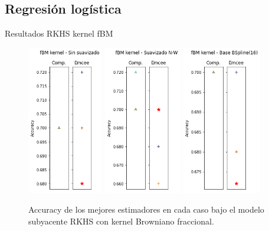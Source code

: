 \documentclass[10pt, professionalfonts]{beamer}
\begin{document}
\subsection{Regresión logística}

\begin{frame}{Resultados RKHS kernel fBM}
  \begin{figure}
    \includegraphics[width=0.295\textwidth]{img/results-new/clf_rkhs_fbm_none}\hfill
    \includegraphics[width=0.3\textwidth]{img/results-new/clf_rkhs_fbm_nw}\hfill
    \includegraphics[width=0.31\textwidth]{img/results-new/clf_rkhs_fbm_basis}
    \caption{Accuracy de los mejores estimadores en cada caso bajo el modelo subyacente RKHS con kernel Browniano fraccional.}
  \end{figure}
\end{frame}
\end{document}
